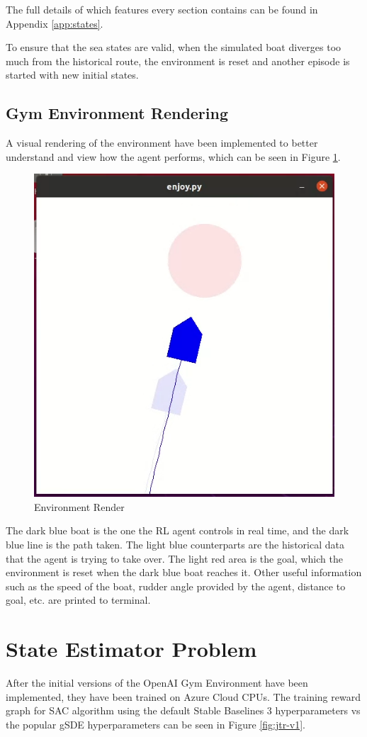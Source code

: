 \documentclass[12pt,twoside]{report}
\begin{document}
\noindent The full details of which features every section contains can be found in Appendix \ref{app:states}.

To ensure that the sea states are valid, when the simulated boat diverges too much from the historical route, the environment is reset and another episode is started with new initial states.

\subsection{Gym Environment Rendering}
A visual rendering of the environment have been implemented to better understand and view how the agent performs, which can be seen in Figure \ref{fig:env-render}.

\begin{figure}[htbp]
\centering
\includegraphics[width = 0.5\hsize]{figures/rl-env/rendering.png}
\caption{Environment Render}
\label{fig:env-render}
\end{figure}

The dark blue boat is the one the RL agent controls in real time, and the dark blue line is the path taken. The light blue counterparts are the historical data that the agent is trying to take over. The light red area is the goal, which the environment is reset when the dark blue boat reaches it. Other useful information such as the speed of the boat, rudder angle provided by the agent, distance to goal, etc. are printed to terminal.

\section{State Estimator Problem} \label{sec:state-estimator-problem}
After the initial versions of the OpenAI Gym Environment have been implemented, they have been trained on Azure Cloud CPUs. The training reward graph for SAC algorithm using the default Stable Baselines 3 hyperparameters vs the popular gSDE hyperparameters can be seen in Figure \ref{fig:jtr-v1}.
\end{document}

